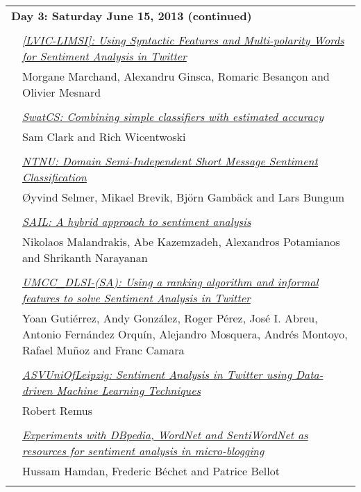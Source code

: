 \begin{tabular}{p{20mm}p{138mm}}
\\
\multicolumn{2}{l}{\bf Day 3: Saturday June 15, 2013 (continued)} \\\\
 & \hyperlink{page.418}{\em [LVIC-LIMSI]: Using Syntactic Features and Multi-polarity Words for Sentiment Analysis in Twitter}\\
         & Morgane Marchand, Alexandru Ginsca, Romaric Besan\c{c}on and Olivier Mesnard \\
\\

 & \hyperlink{page.425}{\em SwatCS: Combining simple classifiers with estimated accuracy}\\
         & Sam Clark and Rich Wicentwoski \\
\\

 & \hyperlink{page.430}{\em NTNU: Domain Semi-Independent Short Message Sentiment Classification}\\
         & {\O}yvind Selmer, Mikael Brevik, Bj\"{o}rn Gamb\"{a}ck and Lars Bungum \\
\\

 & \hyperlink{page.438}{\em SAIL: A hybrid approach to sentiment analysis}\\
         & Nikolaos Malandrakis, Abe Kazemzadeh, Alexandros Potamianos and Shrikanth Narayanan \\
\\

 & \hyperlink{page.443}{\em UMCC\_DLSI-(SA): Using a ranking algorithm and informal features to solve Sentiment Analysis in Twitter}\\
         & Yoan Guti\'{e}rrez, Andy Gonz\'{a}lez, Roger P\'{e}rez, Jos\'{e} I. Abreu, Antonio Fern\'{a}ndez Orqu\'{i}n, Alejandro Mosquera, Andr\'{e}s Montoyo, Rafael Mu\~{n}oz and Franc Camara \\
\\

 & \hyperlink{page.450}{\em ASVUniOfLeipzig: Sentiment Analysis in Twitter using Data-driven Machine Learning Techniques}\\
         & Robert Remus \\
\\

 & \hyperlink{page.455}{\em Experiments with DBpedia, WordNet and SentiWordNet as resources for sentiment analysis in micro-blogging}\\
         & Hussam Hamdan, Frederic B\'{e}chet and Patrice Bellot \\
\\


\end{tabular}
